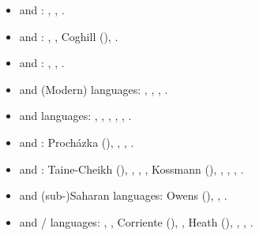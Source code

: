 \documentclass[output=paper]{langsci/langscibook}
\begin{document}
\begin{itemize}[noitemsep,leftmargin=11pt]
\item[\adfhalfrightarrowhead] and : \citet{Retsö2011}, \citet{Weninger2011Aramaic}, \citet{Owens2016Aramaic}.

\item[\adfhalfrightarrowhead] and :
\citet{ArnoldBehnstedt1993}, \citet{Arnold2007}, Coghill (\citeyear{Coghill2010,Coghill2012,Coghill2015}), \citet{Jastrow2015}.

\item[\adfhalfrightarrowhead] and :
\citet{Blau1981}, \citet{Yoda2013}, \citet{Horesh2015}.

\item[\adfhalfrightarrowhead] and (Modern)  languages: \citet{Diem1979}, \citet{Lonnet2011}, \citet{Zammit2011}, \citet{Watson2018}.

\item[\adfhalfrightarrowhead] and  languages: \citet{Asbaghi2011}, \citet{Tsabolov1994}, \citet{Matras2007Domari}, \citet{Gazsi2011}, \citet{WalAnonby2015}, \citet{Herin2018}.

\item[\adfhalfrightarrowhead] and : Procházka (\citeyear{Procházka2002Adana,Procházka2011Turkish}), \citet{Haig2014}, \citet{Taylan2017}, \citet{AkkusBenmamoun2018}.


\item[\adfhalfrightarrowhead] and : Taine-Cheikh (\citeyear{Taine-Cheikh1997Zenaga,Taine-Cheikh2018quadri}), \citet{Brahimi2000}, \citet{Corriente2002}, \citet{LafkiouiBrugnatelli2008}, Kossmann
(\citeyear{Kossmann2009,Kossmann2010,Kossmann2013book}), \citet{ElAissati2011}, \citet{Lafkioui2013reinventing}, \citet{Souag2013book},  \citet{vanPuttenSouag2015}.

\item[\adfhalfrightarrowhead] and (sub-)Saharan languages: Owens (\citeyear{Owens2000article,Owens2015}), \citet{Lafkioui2013book}, \citet{Souag2016sahara}.


\item[\adfhalfrightarrowhead] and / languages: \citet{Brunot1949}, \citet{Benoliel1977}, Corriente (\citeyear{Corriente1978,Corriente1992book}), \citet{Talmoudi1986}, Heath (\citeyear{Heath1989,Heath2015}), \citet{Cifoletti1994}, \citet{Vicente2006}, \citet{Sayahi2014}.


\end{itemize}
\end{document}
